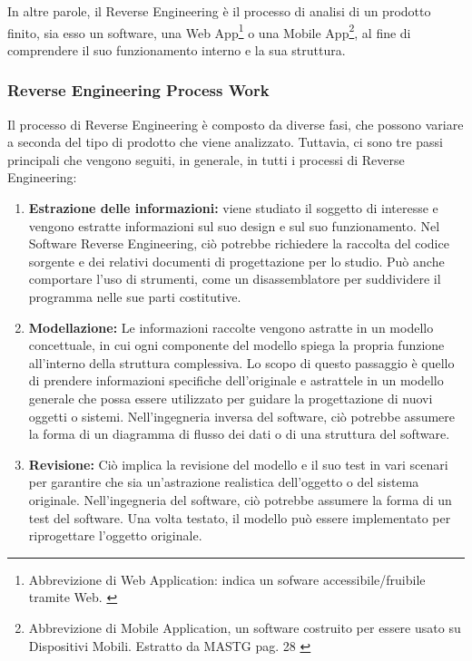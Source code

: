 \documentclass{article}
\begin{document}
In altre parole, il Reverse Engineering è il processo di analisi di un prodotto finito, sia esso un software, una Web App\footnote{Abbrevizione di Web Application: indica un sofware accessibile/fruibile tramite Web. \cite{AWiki}}
o una Mobile App\footnote{Abbrevizione di Mobile Application, un software costruito per essere usato su Dispositivi Mobili. Estratto da MASTG pag. 28 \cite{MASTG}}, al fine di comprendere il suo funzionamento interno e la sua struttura.

\subsubsection{Reverse Engineering Process Work}
Il processo di Reverse Engineering è composto da diverse fasi, che possono variare a seconda del tipo di prodotto che viene analizzato. 
Tuttavia, ci sono tre passi principali che vengono seguiti, in generale, in tutti i processi di Reverse Engineering:

\begin{enumerate}
    \item \textbf{Estrazione delle informazioni:} viene studiato il soggetto di interesse e vengono estratte informazioni sul suo design e sul suo funzionamento.
    Nel Software Reverse Engineering, ciò potrebbe richiedere la raccolta del codice sorgente e dei relativi documenti di 
    progettazione per lo studio. Può anche comportare l'uso di strumenti, 
    come un disassemblatore per suddividere il programma nelle sue parti costitutive.
    \item \textbf{Modellazione:} Le informazioni raccolte vengono astratte in un modello concettuale, 
    in cui ogni componente del modello spiega la propria funzione all'interno della struttura complessiva. 
    Lo scopo di questo passaggio è quello di prendere informazioni specifiche dell'originale e astrattele in un modello generale 
    che possa essere utilizzato per guidare la progettazione di nuovi oggetti o sistemi. Nell'ingegneria inversa del software, 
    ciò potrebbe assumere la forma di un diagramma di flusso dei dati o di una struttura del software.
    \item \textbf{Revisione:} Ciò implica la revisione del modello e il suo test in vari scenari per garantire che sia un'astrazione 
    realistica dell'oggetto o del sistema originale. Nell'ingegneria del software, ciò potrebbe assumere la forma di un test del software. 
    Una volta testato, il modello può essere implementato per riprogettare l'oggetto originale.
\end{enumerate}
\end{document}
